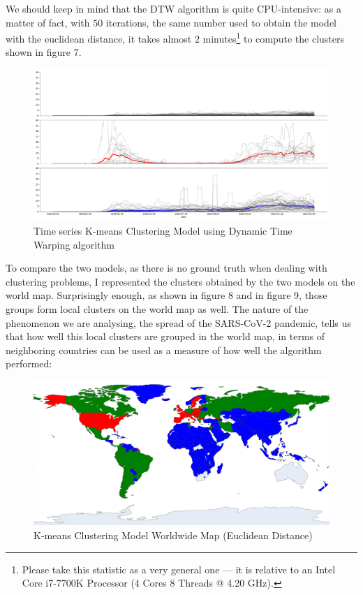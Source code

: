 \documentclass[11pt,a4paper]{article}
\begin{document}
We should keep in mind that the DTW algorithm is quite CPU-intensive: as a
matter of fact, with $50$ iterations, the same number used to obtain the model
with the euclidean distance, it takes almost $2$ minutes\footnote{Please take
this statistic as a very general one --- it is relative to an Intel Core
i7-7700K Processor (4 Cores 8 Threads @ 4.20 GHz).} to compute the clusters
shown in figure 7.
\begin{figure}[H]
    \begin{center}
        \includegraphics[scale=0.32]{img/daily-deaths-dtw-clusters.pdf}
    \end{center}
    \vspace{-0.2cm}
    \caption{Time series K-means Clustering Model using Dynamic Time Warping algorithm}
\end{figure}
\noindent
To compare the two models, as there is no ground truth when dealing with
clustering problems, I represented the clusters obtained by the two models on
the world map. Surprisingly enough, as shown in figure 8 and in figure 9,
those groups form local clusters on the world map as well. The nature of the
phenomenon we are analysing, the spread of the SARS-CoV-2 pandemic, tells us
that how well this local clusters are grouped in the world map, in terms of
neighboring countries can be used as a measure of how well the algorithm
performed:
\begin{figure}[H]
    \begin{center}
        \includegraphics[scale=0.9]{img/euclidean-clusters-map.png}
    \end{center}
    \vspace{-0.2cm}
    \caption{K-means Clustering Model Worldwide Map (Euclidean Distance)}
\end{figure}
\end{document}
